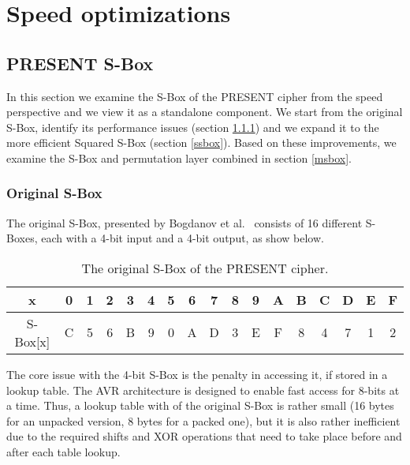 \documentclass{llncs}
\begin{document}
\section{Speed optimizations}
\subsection{PRESENT S-Box}\label{sbox}
In this section we examine the S-Box of the PRESENT cipher from the speed perspective and we view it as a standalone component. We start from the original S-Box, identify its performance issues (section \ref{osbox}) and we expand it to the more efficient Squared S-Box (section \ref{ssbox}). Based on these improvements, we examine the S-Box and permutation layer combined  in section \ref{msbox}.
\subsubsection{Original S-Box}\label{osbox}
The original S-Box, presented by Bogdanov et al.~\cite{bogdanov2007present} consists of 16 different S-Boxes, each with a 4-bit input and a 4-bit output, as show below.\\
\begin{table}[h]
\centering
\begin{tabular}{| c | c  | c | c | c  | c | c | c  | c | c | c  | c | c | c  | c | c | c |}
\hline
  x & 0 & 1 & 2 & 3 & 4 & 5 & 6 & 7 & 8 & 9 & A & B & C & D & E & F   \\
\hline
  S-Box[x] & C & 5 & 6 & B & 9 & 0 & A & D & 3 & E & F & 8 & 4 & 7 & 1 & 2   \\
\hline
\end{tabular}
 \caption{\small The original S-Box of the PRESENT cipher.}
\end{table}


The core issue with the 4-bit S-Box is the penalty in accessing it, if stored in a lookup table. The AVR architecture is designed to enable fast access for 8-bits at a time. Thus, a lookup table with of the original S-Box is rather small (16 bytes for an unpacked version, 8 bytes for a packed one), but it is also rather inefficient due to the required shifts and XOR operations that need to take place before and after each table lookup.
\end{document}
